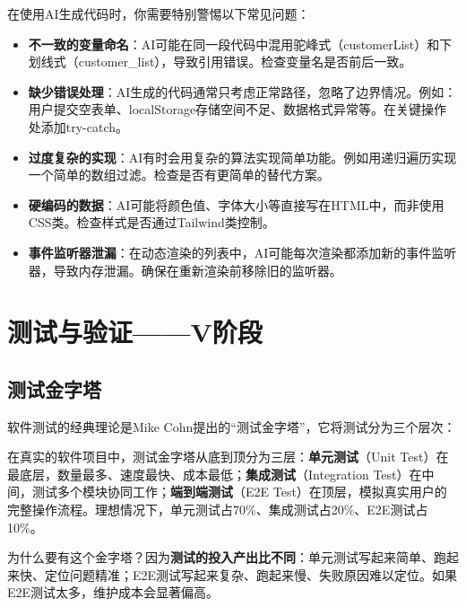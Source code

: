 \begin{warningbox}[AI生成代码的常见问题]
在使用AI生成代码时，你需要特别警惕以下常见问题：
\begin{itemize}[leftmargin=2em]
  \item \textbf{不一致的变量命名}：AI可能在同一段代码中混用驼峰式（customerList）和下划线式（customer\_list），导致引用错误。检查变量名是否前后一致。
  \item \textbf{缺少错误处理}：AI生成的代码通常只考虑正常路径，忽略了边界情况。例如：用户提交空表单、localStorage存储空间不足、数据格式异常等。在关键操作处添加try-catch。
  \item \textbf{过度复杂的实现}：AI有时会用复杂的算法实现简单功能。例如用递归遍历实现一个简单的数组过滤。检查是否有更简单的替代方案。
  \item \textbf{硬编码的数据}：AI可能将颜色值、字体大小等直接写在HTML中，而非使用CSS类。检查样式是否通过Tailwind类控制。
  \item \textbf{事件监听器泄漏}：在动态渲染的列表中，AI可能每次渲染都添加新的事件监听器，导致内存泄漏。确保在重新渲染前移除旧的监听器。
\end{itemize}
\end{warningbox}

\section{测试与验证——V阶段}

\subsection{测试金字塔}

软件测试的经典理论是Mike Cohn提出的“测试金字塔”，它将测试分为三个层次：\par

在真实的软件项目中，测试金字塔从底到顶分为三层：\textbf{单元测试}（Unit Test）在最底层，数量最多、速度最快、成本最低；\textbf{集成测试}（Integration Test）在中间，测试多个模块协同工作；\textbf{端到端测试}（E2E Test）在顶层，模拟真实用户的完整操作流程。理想情况下，单元测试占70\%、集成测试占20\%、E2E测试占10\%。\par

为什么要有这个金字塔？因为\textbf{测试的投入产出比不同}：单元测试写起来简单、跑起来快、定位问题精准；E2E测试写起来复杂、跑起来慢、失败原因难以定位。如果E2E测试太多，维护成本会显著偏高。

